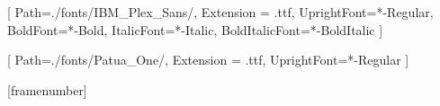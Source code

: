 \usepackage[]{units}
\usepackage{listings}
\usepackage{multicol}
\usepackage{tcolorbox}
\usepackage{physics}



\setmainfont{IBMPlexSans}[
  Path=./fonts/IBM_Plex_Sans/,
  Extension = .ttf,
  UprightFont=*-Regular,
  BoldFont=*-Bold,
  ItalicFont=*-Italic,
  BoldItalicFont=*-BoldItalic
  ]

\setsansfont{PatuaOne}[
  Path=./fonts/Patua_One/,
  Extension = .ttf,
  UprightFont=*-Regular
  ]
  
[framenumber]

\beamertemplatenavigationsymbolsempty
